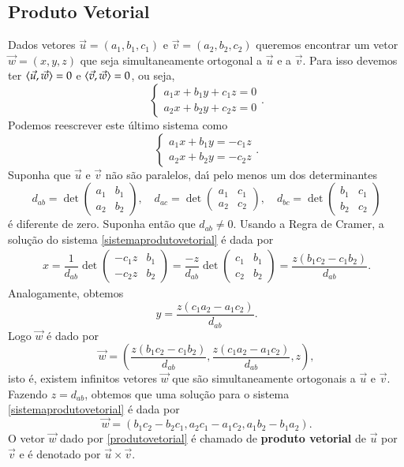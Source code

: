 \subsection{Produto Vetorial} %
\label{sub:produto_vetorial}
Dados vetores $\vec{u} = (a_1,b_1,c_1)$ e $\vec{v} = (a_2,b_2,c_2)$ queremos encontrar um vetor $\vec{w} = (x,y,z)$ que seja simultaneamente ortogonal a $\vec{u}$ e a $\vec{v}$. Para isso devemos ter $\langle \vec{u}, \vec{w} \rangle = 0$ e $\langle \vec{v}, \vec{w} \rangle = 0$, ou seja,
\[
  \begin{cases}
    a_1x + b_1y + c_1z = 0\\
    a_2x + b_2y + c_2z = 0
  \end{cases}.
\]
Podemos reescrever este \'ultimo sistema como
\begin{equation}\label{sistemaprodutovetorial}
  \begin{cases}
    a_1x + b_1y = -c_1z\\
    a_2x + b_2y = -c_2z
  \end{cases}.
\end{equation}
Suponha que $\vec{u}$ e $\vec{v}$ n\~ao s\~ao paralelos, da{\'\i} pelo menos um dos determinantes
\[
d_{ab} = \det \begin{pmatrix}
  a_1 & b_1\\
  a_2 & b_2
\end{pmatrix}, \quad d_{ac} = \det \begin{pmatrix}
  a_1 & c_1\\
  a_2 & c_2
\end{pmatrix},\quad d_{bc} = \det \begin{pmatrix}
  b_1 & c_1\\
  b_2 & c_2
\end{pmatrix}
\]
\'e diferente de zero. Suponha ent\~ao que $d_{ab} \ne 0$. Usando a Regra de Cramer, a solu\c{c}\~ao do sistema \eqref{sistemaprodutovetorial} \'e dada por
\begin{align*}
  x = \dfrac{1}{d_{ab}}\det \begin{pmatrix}
  -c_1z & b_1\\
  -c_2z & b_2
\end{pmatrix} = \dfrac{-z}{d_{ab}}\det \begin{pmatrix}
  c_1 & b_1\\
  c_2 & b_2
\end{pmatrix} = \dfrac{z(b_1c_2 - c_1b_2)}{d_{ab}}.
\end{align*}
Analogamente, obtemos
\[
  y = \dfrac{z(c_1a_2 - a_1c_2)}{d_{ab}}.
\]
Logo $\vec{w}$ \'e dado por
\[
  \vec{w} = \left(\dfrac{z(b_1c_2 - c_1b_2)}{d_{ab}}, \dfrac{z(c_1a_2 - a_1c_2)}{d_{ab}}, z\right),
\]
isto \'e, existem infinitos vetores $\vec{w}$ que s\~ao simultaneamente ortogonais a $\vec{u}$ e $\vec{v}$. Fazendo $z = d_{ab}$, obtemos que uma solu\c{c}\~ao para o sistema \eqref{sistemaprodutovetorial} \'e dada por
\begin{equation}\label{produtovetorial}
  \vec{w} = (b_1c_2 - b_2c_1, a_2c_1 - a_1c_2, a_1b_2 - b_1a_2).
\end{equation}
O vetor $\vec{w}$ dado por \eqref{produtovetorial} \'e chamado de \textbf{produto vetorial} de $\vec{u}$ por $\vec{v}$ e \'e denotado por $\vec{u}\times\vec{v}$.

